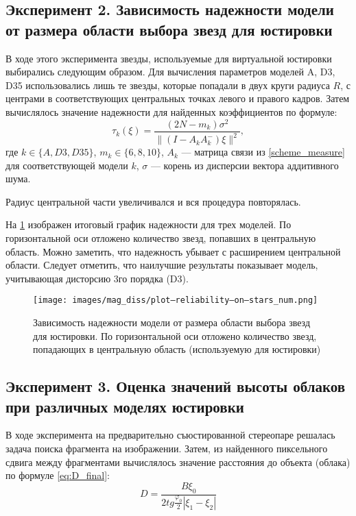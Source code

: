 \subsection{Эксперимент 2. Зависимость надежности модели от размера области выбора звезд для юстировки}
В ходе этого эксперимента звезды, используемые для виртуальной юстировки выбирались следующим образом. Для вычисления параметров моделей A, D3, D35 использовались лишь те звезды, которые попадали в двух круги радиуса $R$, с центрами в соответствующих центральных точках левого и правого кадров. Затем вычислялось значение надежности для найденных коэффициентов по формуле:
\begin{equation}
  \label{eq:reliability}
  \tau_k(\xi) = \frac{ (2N - m_k) \sigma^2 }
                     { \| (I - A_k A_k^-) \xi \|^2 }
  ,
\end{equation}
где $k \in \{ A, D3, D35 \}$, $ m_k \in \{6, 8, 10\} $, $A_k$ --- матрица связи из \eqref{scheme_measure} для соответствующей модели $k$,
$\sigma$ --- корень из дисперсии вектора аддитивного шума.

Радиус центральной части увеличивался и вся процедура повторялась.

На \ref{fig:reliability_on_area} изображен итоговый график надежности для трех моделей. По горизонтальной оси отложено количество звезд, попавших в центральную область. Можно заметить, что надежность убывает с расширением центральной области. Следует отметить, что наилучшие результаты показывает модель, учитывающая дисторсию 3го порядка (D3).

\begin{figure}[H]
  \centering
  \texttt{[image: images/mag\_diss/plot--reliability--on--stars\_num.png]}
  \caption{Зависимость надежности модели от размера области выбора звезд для юстировки. По горизонтальной оси отложено количество звезд, попадающих в центральную область (используемую для юстировки)}
  \label{fig:reliability_on_area}
\end{figure}

%
%

\newpage
\subsection{Эксперимент 3. Оценка значений высоты облаков при различных моделях юстировки}
В ходе эксперимента на предварительно съюстированной стереопаре решалась задача поиска фрагмента на изображении.
Затем, из найденного пиксельного сдвига между фрагментами вычислялось значение расстояния до объекта (облака) по формуле \eqref{eq:D_final}:
\begin{equation*}
  D = \frac{ B \xi_0 }
           { 2 tg \frac{\varphi_0}{2} | \xi_1 - \xi_2 | }
\end{equation*}

